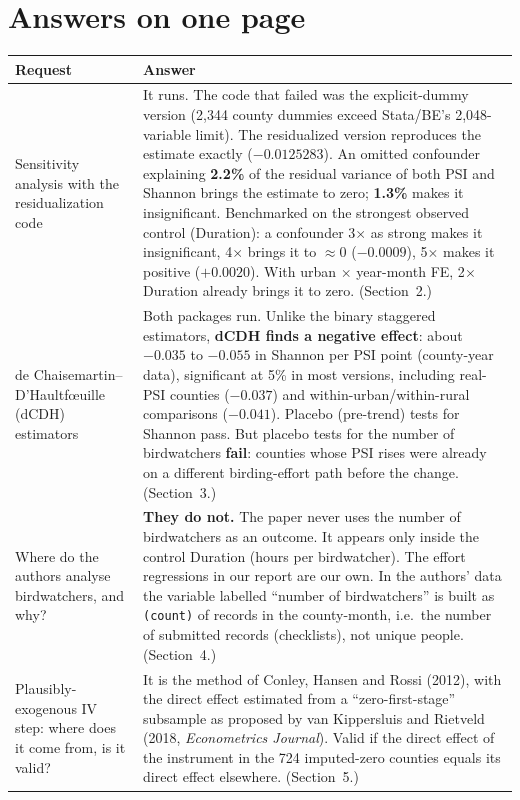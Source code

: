 \documentclass[11pt]{article}
\begin{document}
\section{Answers on one page}
\small
\begin{tabularx}{\linewidth}{>{\raggedright\arraybackslash}p{3.7cm} >{\raggedright\arraybackslash}X}
\toprule
\textbf{Request} & \textbf{Answer} \\
\midrule
Sensitivity analysis with the residualization code &
It runs. The code that failed was the explicit-dummy version (2,344 county dummies exceed Stata/BE's 2,048-variable limit). The residualized version reproduces the estimate exactly ($-0.0125283$). An omitted confounder explaining \textbf{2.2\%} of the residual variance of both PSI and Shannon brings the estimate to zero; \textbf{1.3\%} makes it insignificant. Benchmarked on the strongest observed control (Duration): a confounder 3$\times$ as strong makes it insignificant, 4$\times$ brings it to $\approx 0$ ($-0.0009$), 5$\times$ makes it positive ($+0.0020$). With urban $\times$ year-month FE, 2$\times$ Duration already brings it to zero. (Section~2.) \\
\addlinespace
de Chaisemartin--D'Haultf\oe uille (dCDH) estimators &
Both packages run. Unlike the binary staggered estimators, \textbf{dCDH finds a negative effect}: about $-0.035$ to $-0.055$ in Shannon per PSI point (county-year data), significant at 5\% in most versions, including real-PSI counties ($-0.037$) and within-urban/within-rural comparisons ($-0.041$). Placebo (pre-trend) tests for Shannon pass. But placebo tests for the number of birdwatchers \textbf{fail}: counties whose PSI rises were already on a different birding-effort path before the change. (Section~3.) \\
\addlinespace
Where do the authors analyse birdwatchers, and why? &
\textbf{They do not.} The paper never uses the number of birdwatchers as an outcome. It appears only inside the control Duration (hours per birdwatcher). The effort regressions in our report are our own. In the authors' data the variable labelled ``number of birdwatchers'' is built as \texttt{(count)} of records in the county-month, i.e.\ the number of submitted records (checklists), not unique people. (Section~4.) \\
\addlinespace
Plausibly-exogenous IV step: where does it come from, is it valid? &
It is the method of Conley, Hansen and Rossi (2012), with the direct effect estimated from a ``zero-first-stage'' subsample as proposed by van Kippersluis and Rietveld (2018, \textit{Econometrics Journal}). Valid if the direct effect of the instrument in the 724 imputed-zero counties equals its direct effect elsewhere. (Section~5.) \\

\end{tabularx}
\end{document}
